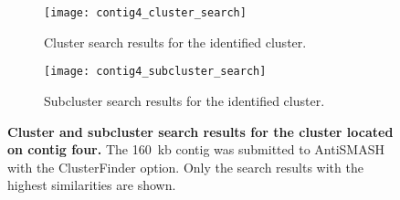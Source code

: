     \begin{figure}[htpb]
        \centering
        \label{fig:cluster_search}
        \begin{subfigure}[b]{\textwidth}
            \texttt{[image: contig4\_cluster\_search]}
            \caption{Cluster search results for the identified cluster.}
            \label{fig:sub1}
        \end{subfigure}

        \begin{subfigure}[b]{\textwidth}
            \texttt{[image: contig4\_subcluster\_search]}
            \caption{Subcluster search results for the identified cluster.}
            \label{fig:sub2}
        \end{subfigure}

        \caption[Cluster and subcluster search results for the cluster located on contig four.]{\textbf{Cluster and subcluster search results for the cluster located on contig four.} The 160~kb contig was submitted to AntiSMASH with the ClusterFinder option. Only the search results with the highest similarities are shown.}
    \end{figure}

